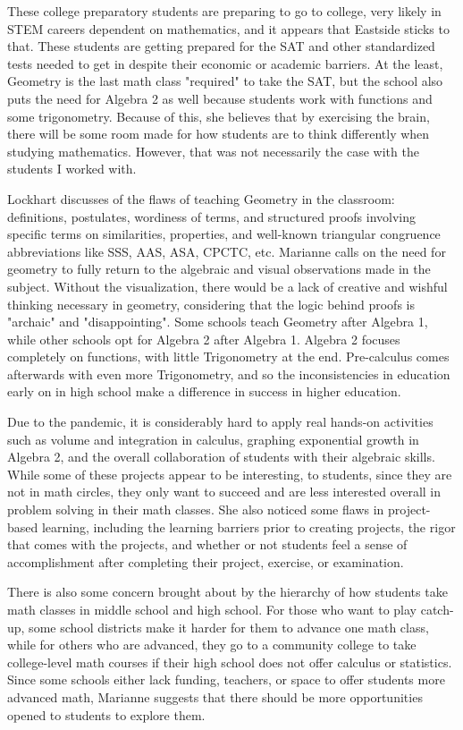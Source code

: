 \documentclass{article}
\begin{document}
These college preparatory students are preparing to go to college, very likely in STEM careers dependent on mathematics, and it appears that Eastside sticks to that. These students are getting prepared for the SAT and other standardized tests needed to get in despite their economic or academic barriers. At the least, Geometry is the last math class "required" to take the SAT, but the school also puts the need for Algebra 2 as well because students work with functions and some trigonometry. Because of this, she believes that by exercising the brain, there will be some room made for how students are to think differently when studying mathematics. However, that was not necessarily the case with the students I worked with. 

Lockhart discusses of the flaws of teaching Geometry in the classroom: definitions, postulates, wordiness of terms, and structured proofs involving specific terms on similarities, properties, and well-known triangular congruence abbreviations like SSS, AAS, ASA, CPCTC, etc. Marianne calls on the need for geometry to fully return to the algebraic and visual observations made in the subject. Without the visualization, there would be a lack of creative and wishful thinking necessary in geometry, considering that the logic behind proofs is "archaic" and "disappointing". Some schools teach Geometry after Algebra 1, while other schools opt for Algebra 2 after Algebra 1. Algebra 2 focuses completely on functions, with little Trigonometry at the end. Pre-calculus comes afterwards with even more Trigonometry, and so the inconsistencies in education early on in high school make a difference in success in higher education. 

Due to the pandemic, it is considerably hard to apply real hands-on activities such as volume and integration in calculus, graphing exponential growth in Algebra 2, and the overall collaboration of students with their algebraic skills. While some of these projects appear to be interesting, to students, since they are not in math circles, they only want to succeed and are less interested overall in problem solving in their math classes. She also noticed some flaws in project-based learning, including the learning barriers prior to creating projects, the rigor that comes with the projects, and whether or not students feel a sense of accomplishment after completing their project, exercise, or examination. 

There is also some concern brought about by the hierarchy of how students take math classes in middle school and high school. For those who want to play catch-up, some school districts make it harder for them to advance one math class, while for others who are advanced, they go to a community college to take college-level math courses if their high school does not offer calculus or statistics. Since some schools either lack funding, teachers, or space to offer students more advanced math, Marianne suggests that there should be more opportunities opened to students to explore them. 
\end{document}
